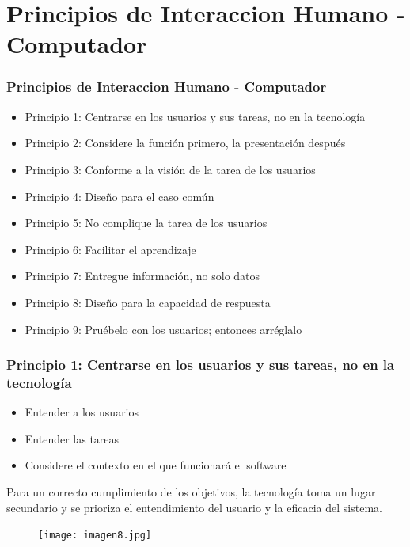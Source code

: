 \documentclass[11pt]{beamer}
\begin{document}
\section{Principios de Interaccion Humano - Computador}
\begin{frame}
\frametitle{Principios de Interaccion Humano - Computador}
\begin{itemize}
    \item Principio 1: Centrarse en los usuarios y sus tareas, no en la tecnología
    \item Principio 2: Considere la función primero, la presentación después
    \item Principio 3: Conforme a la visión de la tarea de los usuarios
    \item Principio 4: Diseño para el caso común
    \item Principio 5: No complique la tarea de los usuarios
    \item Principio 6: Facilitar el aprendizaje
    \item Principio 7: Entregue información, no solo datos
    \item Principio 8: Diseño para la capacidad de respuesta
    \item Principio 9: Pruébelo con los usuarios; entonces arréglalo
\end{itemize}
\end{frame}


\begin{frame}
\frametitle{Principio 1: Centrarse en los usuarios y sus tareas, no en la tecnología}
    \par
    \justify
    \color{black}
    \begin{itemize}
    \item Entender a los usuarios
    \item Entender las tareas
    \item Considere el contexto en el que funcionará el software
    \end{itemize}
    \par
    \vspace{2mm}
    Para un correcto cumplimiento de los objetivos, la tecnología toma un lugar secundario y se prioriza el entendimiento del usuario y la eficacia del sistema.
    \begin{figure}
    \centering
     \texttt{[image: imagen8.jpg]} 
    \end{figure}
\end{frame}
\end{document}
